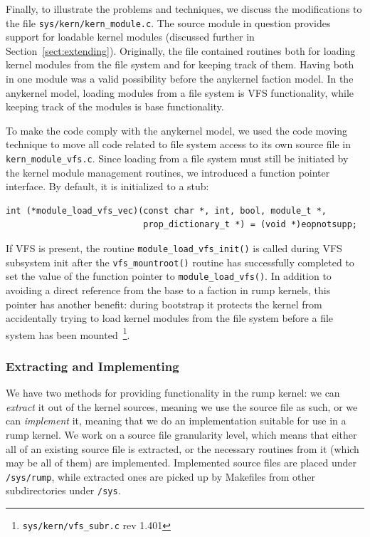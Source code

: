 Finally, to illustrate the problems and techniques, we discuss
the modifications to the file \verb+sys/kern/kern_module.c+.  The
source module in question provides support for loadable kernel
modules (discussed further in Section~\ref{sect:extending}).
Originally, the file contained routines both for loading kernel
modules from the file system and for keeping track of them.  Having
both in one module was a valid possibility before the anykernel faction
model.  In the anykernel model, loading modules from a file system is VFS
functionality, while keeping track of the modules is base functionality.

To make the code comply with the anykernel model, we used the code
moving technique to move all code related to file system access to
its own source file in \verb+kern_module_vfs.c+.  Since loading from
a file system must still be initiated by the kernel module management
routines, we introduced a function pointer interface.  By default,
it is initialized to a stub:

{\small
\begin{verbatim}
int (*module_load_vfs_vec)(const char *, int, bool, module_t *,
                           prop_dictionary_t *) = (void *)eopnotsupp; 
\end{verbatim}}

If VFS is present, the routine \verb+module_load_vfs_init()+ is
called during VFS subsystem init after the \verb+vfs_mountroot()+
routine has successfully completed to set the value of the function
pointer to \verb+module_load_vfs()+.  In addition to avoiding a
direct reference from the base to a faction in rump kernels, this
pointer has another benefit: during bootstrap it protects the kernel from
accidentally trying to load kernel modules from the file system before
a file system has been mounted~\footnote{\texttt{sys/kern/vfs\_subr.c}
rev 1.401}.

\subsubsection{Extracting and Implementing}

We have two methods for providing functionality in the rump kernel:
we can \textit{extract} it out of the kernel sources, meaning we
use the source file as such, or we can \textit{implement}
it, meaning that we do an implementation suitable for use in a rump
kernel.  We work on a source file granularity level, which means
that either all of an existing source file is extracted, or the
necessary routines from it (which may be all of them) are implemented.
Implemented source files are placed under \texttt{/sys/rump},
while extracted ones are picked up by Makefiles from other subdirectories
under \texttt{/sys}.

